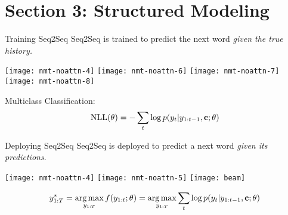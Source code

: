 
\section{Section 3: Structured Modeling }

\begin{frame}{Training Seq2Seq}
  Seq2Seq is trained to predict the next word \textit{given the true history.}

  \begin{center}
  \texttt{[image: nmt-noattn-4]}
  \texttt{[image: nmt-noattn-6]}
  \texttt{[image: nmt-noattn-7]}
  \texttt{[image: nmt-noattn-8]}
  \end{center}
  Multiclass Classification:
  \[ \text{NLL}(\theta) = -\sum_{t} \log p(y_t |  y_{1:t-1}, \mathbf{c}; \theta) \] 
\end{frame}

\begin{frame}{Deploying Seq2Seq}
  Seq2Seq is deployed to predict a next word \textit{given its predictions}.


  \begin{center}
  \texttt{[image: nmt-noattn-4]}
  \texttt{[image: nmt-noattn-5]}
  \texttt{[image: beam]}


  \end{center}

  \[ y^*_{1:T} = \argmax_{y_{1:T}} f(y_{1:t}; \theta) = \argmax_{y_{1:T}} \sum_{t} \log p(y_{t} | y_{1:t-1}, \cvec; \theta) \] 
\end{frame}

